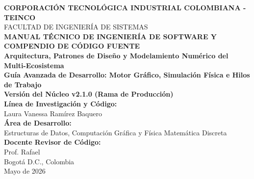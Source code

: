 \documentclass[11pt,a4paper]{article}
\begin{document}
	
	\begin{titlepage}
		\centering
		\vspace*{1cm}
		{\large\bfseries CORPORACIÓN TECNOLÓGICA INDUSTRIAL COLOMBIANA - TEINCO} \\[0.3cm]
		{\large FACULTAD DE INGENIERÍA DE SISTEMAS} \\[2.5cm]
		
		{\color{teincoblue}\Huge\bfseries MANUAL TÉCNICO DE INGENIERÍA DE SOFTWARE Y COMPENDIO DE CÓDIGO FUENTE} \\[0.8cm]
		{\color{accentblue}\Large\bfseries Arquitectura, Patrones de Diseño y Modelamiento Numérico del Multi-Ecosistema} \\[0.5cm]
		{\large\bfseries Guía Avanzada de Desarrollo: Motor Gráfico, Simulación Física e Hilos de Trabajo} \\[1cm]
		{\normalsize\bfseries Versión del Núcleo v2.1.0 (Rama de Producción)} \\[2.5cm]
		
		\textbf{Línea de Investigación y Código:} \\
		Laura Vanessa Ramírez Baquero \\
	
		\textbf{Área de Desarrollo:} \\
		Estructuras de Datos, Computación Gráfica y Física Matemática Discreta \\[1.5cm]
		
		\textbf{Docente Revisor de Código:} \\
		Prof. Rafael \\[2cm]
		
		\vfill
		{\large Bogotá D.C., Colombia \\ Mayo de 2026}
	\end{titlepage}
	
	\tableofcontents
	\clearpage
	
	
\end{document}
